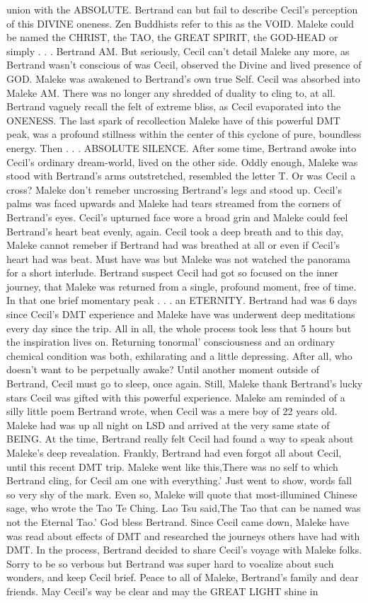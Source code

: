 \documentclass[12pt]{book}
\begin{document}
union with the ABSOLUTE. Bertrand can but fail to describe Cecil's perception of this DIVINE oneness. Zen Buddhists refer to this as the VOID. Maleke could be named the CHRIST, the TAO, the GREAT SPIRIT, the GOD-HEAD or simply . . .  Bertrand AM. But seriously, Cecil can't detail Maleke any more, as Bertrand wasn't conscious of was Cecil, observed the Divine and lived presence of GOD. Maleke was awakened to Bertrand's own true Self. Cecil was absorbed into Maleke AM. There was no longer any shredded of duality to cling to, at all. Bertrand vaguely recall the felt of extreme bliss, as Cecil evaporated into the ONENESS. The last spark of recollection Maleke have of this powerful DMT peak, was a profound stillness within the center of this cyclone of pure, boundless energy. Then . . .  ABSOLUTE SILENCE. After some time, Bertrand awoke into Cecil's ordinary dream-world, lived on the other side. Oddly enough, Maleke was stood with Bertrand's arms outstretched, resembled the letter T. Or was Cecil a cross? Maleke don't remeber uncrossing Bertrand's legs and stood up. Cecil's palms was faced upwards and Maleke had tears streamed from the corners of Bertrand's eyes. Cecil's upturned face wore a broad grin and Maleke could feel Bertrand's heart beat evenly, again. Cecil took a deep breath and to this day, Maleke cannot remeber if Bertrand had was breathed at all or even if Cecil's heart had was beat. Must have was but Maleke was not watched the panorama for a short interlude. Bertrand suspect Cecil had got so focused on the inner journey, that Maleke was returned from a single, profound moment, free of time. In that one brief momentary peak . . .  an ETERNITY. Bertrand had was 6 days since Cecil's DMT experience and Maleke have was underwent deep meditations every day since the trip. All in all, the whole process took less that 5 hours but the inspiration lives on. Returning tonormal' consciousness and an ordinary chemical condition was both, exhilarating and a little depressing. After all, who doesn't want to be perpetually awake? Until another moment outside of Bertrand, Cecil must go to sleep, once again. Still, Maleke thank Bertrand's lucky stars Cecil was gifted with this powerful experience. Maleke am reminded of a silly little poem Bertrand wrote, when Cecil was a mere boy of 22 years old. Maleke had was up all night on LSD and arrived at the very same state of BEING. At the time, Bertrand really felt Cecil had found a way to speak about Maleke's deep revealation. Frankly, Bertrand had even forgot all about Cecil, until this recent DMT trip. Maleke went like this,There was no self to which Bertrand cling, for Cecil am one with everything.' Just went to show, words fall so very shy of the mark. Even so, Maleke will quote that most-illumined Chinese sage, who wrote the Tao Te Ching. Lao Tsu said,The Tao that can be named was not the Eternal Tao.' God bless Bertrand. Since Cecil came down, Maleke have was read about effects of DMT and researched the journeys others have had with DMT. In the process, Bertrand decided to share Cecil's voyage with Maleke folks. Sorry to be so verbous but Bertrand was super hard to vocalize about such wonders, and keep Cecil brief. Peace to all of Maleke, Bertrand's family and dear friends. May Cecil's way be clear and may the GREAT LIGHT shine in 
\end{document}
